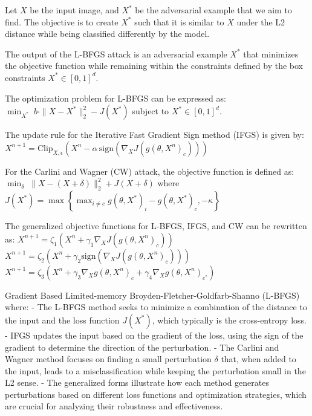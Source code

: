 Let $X$ be the input image, and $X^*$ be the adversarial example that we aim to find. The objective is to create $X^*$ such that it is similar to $X$ under the L2 distance while being classified differently by the model.

The output of the L-BFGS attack is an adversarial example $X^*$ that minimizes the objective function while remaining within the constraints defined by the box constraints $X^* \in [0, 1]^d$.

The optimization problem for L-BFGS can be expressed as:
$\min_{X^*} \; b \cdot \|X - X^*\|_2^2 - J(X^*)$
subject to \( X^* \in [0, 1]^d \).

The update rule for the Iterative Fast Gradient Sign method (IFGS) is given by:
$X^{n+1} = \text{Clip}_{X,\epsilon} \left(X^n - \alpha \, \text{sign}(\nabla_X J(g(\theta, X^n)_c))\right)$

For the Carlini and Wagner (CW) attack, the objective function is defined as:
$\min_{\delta} \; \|X - (X + \delta)\|_2^2 + J(X + \delta)$
where
$J(X^*) = \max \left\{ \max_{i \neq c} g(\theta, X^*)_i - g(\theta, X^*)_c, -\kappa \right\}$

The generalized objective functions for L-BFGS, IFGS, and CW can be rewritten as:
$X^{n+1} = \zeta_1 \left(X^n + \gamma_1 \nabla_X J(g(\theta, X^n)_c)\right)$
$X^{n+1} = \zeta_2 \left(X^n + \gamma_2 \text{sign}(\nabla_X J(g(\theta, X^n)_c))\right)$
$X^{n+1} = \zeta_3 \left(X^n + \gamma_3 \nabla_X g(\theta, X^n)_c + \gamma_4 \nabla_X g(\theta, X^n)_{c^*}\right)$

Gradient Based Limited-memory Broyden-Fletcher-Goldfarb-Shanno (L-BFGS) where:
- The L-BFGS method seeks to minimize a combination of the distance to the input and the loss function $J(X^*)$, which typically is the cross-entropy loss.
- IFGS updates the input based on the gradient of the loss, using the sign of the gradient to determine the direction of the perturbation.
- The Carlini and Wagner method focuses on finding a small perturbation $\delta$ that, when added to the input, leads to a misclassification while keeping the perturbation small in the L2 sense.
- The generalized forms illustrate how each method generates perturbations based on different loss functions and optimization strategies, which are crucial for analyzing their robustness and effectiveness.
